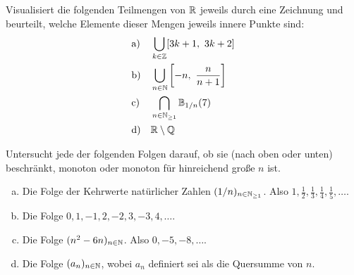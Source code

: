 \begin{aufg}
    Visualisiert die folgenden Teilmengen von $\mathbb R$ jeweils durch eine Zeichnung und beurteilt, welche Elemente dieser Mengen jeweils innere Punkte sind:
    \begin{align*}
        &\text{a)} && \bigcup_{k\in \Z} [3k+1,\ 3k+2] \\
        &\text{b)} && \bigcup_{n\in \N} \left[ -n,\ \frac{n}{n+1} \right] \\
        &\text{c)} && \bigcap_{n\in \N_{\ge 1}} \bbB_{1/n}(7) \\
        &\text{d)} && \R\setminus \Q
    \end{align*}
\end{aufg}


\begin{aufg}
    Untersucht jede der folgenden Folgen darauf, ob sie (nach oben oder unten) beschränkt, monoton oder monoton für hinreichend große $n$ ist.
    \begin{enumerate}[a)]
        \item Die Folge der Kehrwerte natürlicher Zahlen $(1/n)_{n\in \mathbb N_{\ge 1}}$. Also $1,\frac{1}{2},\frac{1}{3},\frac{1}{4},\frac{1}{5},\dots$.
        \item Die Folge $0,1,-1,2,-2,3,-3,4,\dots$.
        \item Die Folge $(n^2-6n)_{n\in \mathbb N}$. Also $0,-5,-8,\dots$.
        \item Die Folge $(a_n)_{n\in \mathbb N}$, wobei $a_n$ definiert sei als die Quersumme von $n$.
    \end{enumerate}
\end{aufg}

